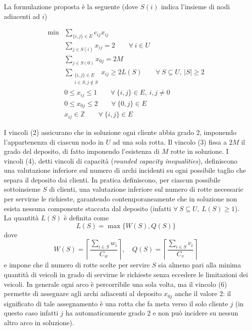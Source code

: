 \documentclass[11pt,oneside,a4paper]{article}
\begin{document}
La formulazione proposta è la seguente (dove $S(i)$ indica l'insieme di nodi adiacenti ad $i$) 

\begin{align}
  \min& \sum_{\{i,j\} \in E} c_{ij}x_{ij} \\
  & \sum_{j \in S(i)} x_{ij} = 2 \qquad \forall \: i \in U \\
  & \sum_{j \in S(0)} x_{0j} = 2M \\
  &\sum_{\substack{\{i,j\} \in E \\ i \in S, j \notin S}} x_{ij} \geq 2L(S) \qquad
    \forall \: S \subseteq U,\:|S| \geq 2 \\
  & 0 \leq x_{ij} \leq 1 \qquad \forall \: \{i,j\} \in E,\: i,j \neq 0 \\
  & 0 \leq x_{0j} \leq 2 \qquad \forall \: \{0,j\} \in E \\
  & x_{ij} \in \mathbb{Z} \qquad \forall \: \{i,j\} \in E
\end{align}

I vincoli (2) assicurano che in soluzione ogni cliente abbia grado $2$, imponendo
l'appartenenza di ciascun nodo in $U$ ad una sola rotta.
Il vincolo (3) fissa a $2M$ il grado del deposito, di fatto imponendo
l'esistenza di $M$ rotte in soluzione.
I vincoli (4), detti vincoli di capacità (\emph{rounded capacity inequalities}),
definiscono una valutazione inferiore sul numero di archi incidenti su ogni possibile
taglio che separa il deposito dai clienti. In pratica definiscono, per ciascun possibile
sottoinsieme $S$ di clienti, una valutazione inferiore sul numero di rotte necessarie per
servirne le richieste, garantendo contemporaneamente che in soluzione non esista nessuna
componente staccata dal deposito (infatti $\forall \: S \subseteq U, \: L(S) \geq 1$).
La quantità $L(S)$ è definita come
\begin{equation*}
  L(S) = \max\{W(S),Q(S)\}
\end{equation*}
dove
\begin{equation*}
  W(S) = \left\lceil\frac{\sum_{i \in S} w_i}{C_w}\right\rceil, \quad
  Q(S) = \left\lceil\frac{\sum_{i \in S} v_i}{C_v}\right\rceil
\end{equation*}
e impone che il numero di rotte scelte per servire $S$ sia almeno pari alla minima
quantità di veicoli in grado di servirne le richieste senza eccedere le limitazioni dei
veicoli. In generale ogni arco è percorribile una sola volta, ma il vincolo (6) permette
di assegnare agli archi adiacenti al deposito $x_{0j}$ anche il valore 2: il significato di
tale assegnamento è una rotta che fa meta verso il solo cliente $j$ (in questo caso infatti
$j$ ha automaticamente grado 2 e non può incidere su nessun altro arco in soluzione).
\end{document}

